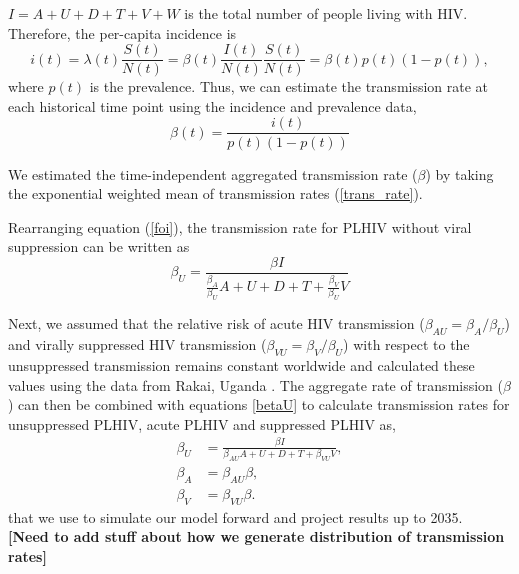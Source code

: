 \documentclass[11pt]{article}
\newcommand{\comment}[1]{\textbf{[#1]}}
\begin{document}
$I = A+U+D+T+V+W$ is the total number of people living with HIV. Therefore, the per-capita
incidence is
\begin{equation}
i(t) = \lambda(t) \frac{S(t)}{N(t)}
= \beta(t) \frac{I(t)}{N(t)} \frac{S(t)}{N(t)} =\beta(t) p(t) (1-p(t)),
\end{equation}
where $p(t)$ is the prevalence. Thus, we can estimate the
transmission rate at each historical time point using the incidence
and prevalence data,
\begin{equation}
  \label{trans_rate}
  \beta(t) = \frac{i(t)}{p(t)(1-p(t))}
\end{equation}


We estimated the time-independent aggregated transmission rate ($\beta$)
by taking the exponential weighted mean of transmission rates
(\ref{trans_rate}).


Rearranging equation (\ref{foi}), the transmission rate for PLHIV
without viral suppression can be written as
\begin{equation}
\label{betaU}
  \beta_{U} = \frac{\beta I}{\frac{\beta_{A}}{\beta_{U}}A +
    U+D+T+\frac{\beta_{V}}{\beta_{U}}V}
\end{equation}


Next, we assumed that the relative risk of acute HIV transmission
($\beta_{AU} = \beta_{A}/\beta_{U}$) and virally suppressed HIV
transmission ($\beta_{VU} = \beta_{V}/\beta_{U}$) with respect to the
unsuppressed transmission remains constant worldwide and calculated
these values using the data from Rakai, Uganda \cite{Wawer2005-us}. The aggregate
rate of transmission ($\beta$) can then be combined with equations \ref{betaU} to calculate transmission
rates for unsuppressed PLHIV, acute PLHIV and suppressed PLHIV as,
\begin{align}
  \beta_{U} & = \frac{\beta I}{\beta_{AU}A +
              U+D+T+\beta_{VU}V}, \\
  \beta_{A} & = \beta_{AU}\beta, \\
  \beta_{V} & = \beta_{VU} \beta.
\end{align}
that we use to simulate our model forward and project results up to 2035.
\\

\comment{Need to add stuff about how we generate distribution of
  transmission rates}
\end{document}
